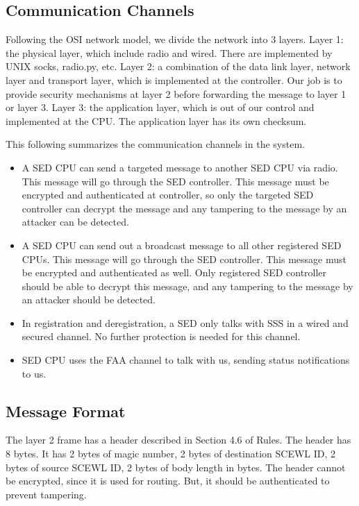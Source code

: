 \documentclass[11pt,oneside,onecolumn,letterpaper]{article}
\begin{document}
\subsection{Communication Channels}

Following the OSI network model, we divide the network into 3 layers. 
Layer 1: the physical layer, which include radio and wired. There are implemented by UNIX socks, radio.py, etc.
Layer 2: a combination of the data link layer, network layer and transport layer, which is implemented at the controller. 
Our job is to provide security mechanisms at layer 2 before forwarding the message to layer 1 or layer 3.
Layer 3: the application layer, which is out of our control and implemented at the CPU. The application layer has its own checksum.

This following summarizes the communication channels in the system.

\begin{itemize}
	\item A SED CPU can send a targeted message to another SED CPU via radio. This message will go through the SED controller. This message must be encrypted and authenticated at controller, so only the targeted SED controller can decrypt the message and any tampering to the message by an attacker can be detected. 
	
	\item A SED CPU can send out a broadcast message to all other registered SED CPUs. This message will go through the SED controller. This message must be encrypted and authenticated as well. Only registered SED controller should be able to decrypt this message, and any tampering to the message by an attacker should be detected. 
	
	\item In registration and deregistration, a SED only talks with SSS in a wired and secured channel. No further protection is needed for this channel.
	
	\item SED CPU uses the FAA channel to talk with us, sending status notifications to us.
\end{itemize}

\subsection{Message Format}

The layer 2 frame has a header described in Section 4.6 of Rules.
The header has 8 bytes.
It has 2 bytes of magic number, 2 bytes of destination SCEWL ID, 2 bytes of source SCEWL ID, 2 bytes of body length in bytes.
The header cannot be encrypted, since it is used for routing.
But, it should be authenticated to prevent tampering.
\end{document}
